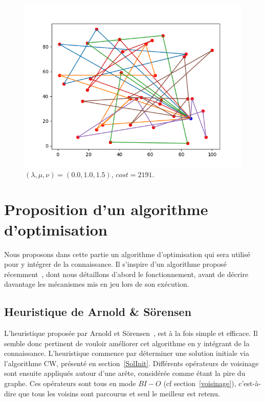 \documentclass[a4paper,11pt]{article}%
\begin{document}
\begin{figure}
\begin{minipage}[c]{.42\linewidth}
	\caption{$(\lambda, \mu, \nu)=(0.1,0.1,0.1)$, $cost = 1569$.}
	\label{resCW111}
    \end{minipage}
    
    
        \centering
	\includegraphics[scale=0.4]{resCW001015.png}
 	\caption{$(\lambda, \mu, \nu)=(0.0,1.0,1.5)$, $cost = 2191$.}
 	\label{resCW001015}
    
\end{figure}

\section{Proposition d'un algorithme d'optimisation}
\label{opti}
Nous proposons dans cette partie un algorithme d'optimisation qui sera utilisé pour y intégrer de la connaissance. Il s'inspire d'un algorithme proposé récemment~\cite{Sorensen_2017}, dont nous détaillons d'abord le fonctionnement, avant de décrire davantage les mécanismes mis en jeu lors de son exécution.

\subsection{Heuristique de Arnold \& Sörensen}
L'heuristique proposée par Arnold et Sörensen~\cite{Sorensen_2017}, est à la fois simple et efficace. 
Il semble donc pertinent de vouloir améliorer cet algorithme en y intégrant de la connaissance.
L'heuristique commence par déterminer une solution initiale via l'algorithme CW, présenté en section~\ref{SolInit}. Différents opérateurs de voisinage sont ensuite appliqués autour d'une arête, considérée comme étant la pire du graphe. Ces opérateurs sont tous en mode $BI-O$ (cf section~\ref{voisinage}), c'est-à-dire que tous les voisins sont parcourus et seul le meilleur est retenu.
\end{document}
